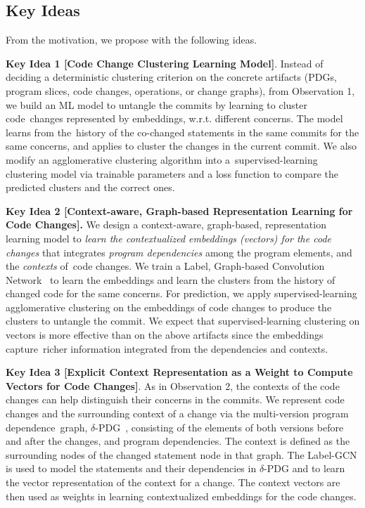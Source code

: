 \subsection{Key Ideas}
\label{ideas:sec}

From the motivation, we propose {\tool} with the following
ideas.


{\bf Key Idea 1 [Code Change Clustering Learning Model]}. Instead of
deciding a deterministic clustering criterion on the concrete
artifacts (PDGs, program slices, code changes, operations, or change
graphs), from Observation 1, we build an ML model to untangle the
commits by learning to cluster code~changes represented by embeddings,
w.r.t. different concerns. The model learns from the~history of the
co-changed statements in the same commits for the same concerns, and
applies to cluster the changes in the current commit.  We also modify
an agglomerative clustering algorithm into a~super\-vised-learning
clustering model via trainable parameters and a loss function to
compare the predicted clusters and the correct ones.

{\bf Key Idea 2 [Context-aware, Graph-based Representation Learning
    for Code Changes].} We design a context-aware, graph-based,
representation learning model to {\em learn the contextualized
  embeddings (vectors) for the code changes} that integrates {\em
  program dependencies} among the program elements, and the {\em
  contexts} of~code changes. We train a Label, Graph-based Convolution
Network~\cite{yi} to learn the embeddings and learn the clusters from the
history of changed code for the same concerns.
For prediction, we apply supervised-learning agglomerative
clustering on the embeddings of code changes to produce the clusters
to untangle the commit. We expect that supervised-learning clustering
on vectors is more effective than on the above artifacts since the
embeddings capture~richer information integrated from the
dependencies and contexts.


{\bf Key Idea 3 [Explicit Context Representation as a Weight to
    Compute Vectors for Code Changes]}. As in Observation 2, the
contexts of the code changes can help distinguish their concerns in
the commits. We represent code changes and the surrounding context of
a change via the multi-version program dependence~graph,
$\delta$-PDG~\cite{flexeme-fse20}, consisting of the elements of both
versions before and after the changes, and program dependencies. The
context is defined as the surrounding nodes of the changed statement
node in that graph. The Label-GCN is used to model the statements and their
dependencies in $\delta$-PDG and to learn the vector
representation of the context for a change. The context vectors are
then used as weights in learning contextualized embeddings for the
code changes.

